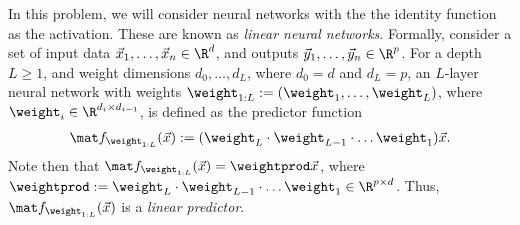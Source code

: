 \documentclass[preview]{standalone}
\begin{document}
In this problem, we will consider neural networks with the the identity function as the activation. These are known as \emph{linear neural networks}. Formally, consider a set of input data $\vec x_1,\dots,\vec x_n \in \R^d$, and outputs $\vec y_1,\dots,\vec y_n \in \R^p$. For a depth $L \ge 1$, and weight dimensions $d_0,\dots,d_L$, where $d_0 = d$ and $d_L = p$, an $L$-layer neural network with weights $\weight_{1:L} := (\weight_1,\dots,\weight_L)$, where $\weight_i \in \R^{d_{i} \times d_{i-1}}$, is defined as the predictor function
\begin{align*}
\mat f_{\weight_{1:L}}(\vec x) := (\weight_L \cdot \weight_{L-1} \cdot \dots \weight_{1})\vec x.
\end{align*}
Note then that $\mat f_{\weight_{1:L}}(\vec x) = \weightprod \vec x$, where $\weightprod := \weight_L \cdot \weight_{L-1} \cdot \dots \weight_{1} \in \R^{p\times d}$. Thus, $\mat f_{\weight_{1:L}}(\vec x)$ is a \emph{linear predictor}.
\end{document}
